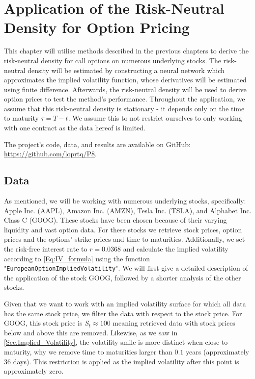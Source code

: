\chapter{Application of the Risk-Neutral Density for Option Pricing}\label{Ch.5}
This chapter will utilise methods described in the previous chapters to derive the risk-neutral density for call options on numerous underlying stocks. The risk-neutral density will be estimated by constructing a neural network which approximates the implied volatility function, whose derivatives will be estimated using finite difference. Afterwards, the risk-neutral density will be used to derive option prices to test the method's performance. Throughout the application, we assume that this risk-neutral density is stationary - it depends only on the time to maturity $\tau=T-t$. We assume this to not restrict ourselves to only working with one contract as the data hereof is limited.

The project's code, data, and results are available on GitHub: \url{https://github.com/loprtq/P8}.


\section*{Data}
As mentioned, we will be working with numerous underlying stocks, specifically: Apple Inc. (AAPL), Amazon Inc. (AMZN), Tesla Inc. (TSLA), and Alphabet Inc. Class C (GOOG). These stocks have been chosen because of their varying liquidity and vast option data. For these stocks we retrieve stock prices, option prices and the options' strike prices and time to maturities. Additionally, we set the risk-free interest rate to $r=0.0368$ and calculate the implied volatility according to \eqref{Eq:IV_formula} using the function "\lstinline{EuropeanOptionImpliedVolatility}". We will first give a detailed description of the application of the stock GOOG, followed by a shorter analysis of the other stocks.

Given that we want to work with an implied volatility surface for which all data has the same stock price, we filter the data with respect to the stock price. For GOOG, this stock price is $S_t\approx100$ meaning retrieved data with stock prices below and above this are removed. Likewise, as we saw in \autoref{Sec.Implied_Volatility}, the volatility smile is more distinct when close to maturity, why we remove time to maturities larger than $0.1$ years (approximately 36 days). This restriction is applied as the implied volatility after this point is approximately zero. 

